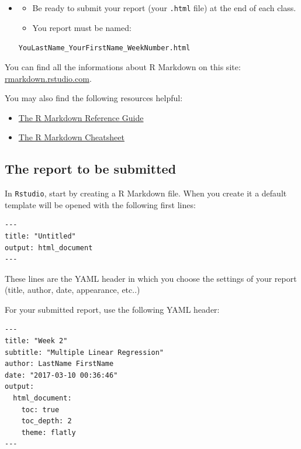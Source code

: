 \documentclass[]{book}
\providecommand{\tightlist}{%
  \setlength{\itemsep}{0pt}\setlength{\parskip}{0pt}}
\newenvironment{rmdblock}[1]
  {\begin{shaded*}
  \begin{itemize}
  \renewcommand{\labelitemi}{
    \raisebox{-.7\height}[0pt][0pt]{
      {\setkeys{Gin}{width=2em,keepaspectratio}\texttt{[image: img/icons/\#1]}}
    }
  }
  \item
  }
  {
  \end{itemize}
  \end{shaded*}
  }
\newenvironment{rmdcaution}
  {\begin{rmdblock}{caution}}
  {\end{rmdblock}}
\begin{document}
\begin{rmdcaution}
\begin{itemize}
\item
  Be ready to submit your report (your \texttt{.html} file) at the end
  of each class.
\item
  You report must be named:
\end{itemize}

\texttt{YouLastName\_YourFirstName\_WeekNumber.html}
\end{rmdcaution}

You can find all the informations about R Markdown on this site:
\href{http://rmarkdown.rstudio.com/lesson-1.html}{rmarkdown.rstudio.com}.

You may also find the following resources helpful:

\begin{itemize}
\tightlist
\item
  \href{https://www.rstudio.com/wp-content/uploads/2015/03/rmarkdown-reference.pdf}{The
  R Markdown Reference Guide}
\item
  \href{https://www.rstudio.com/wp-content/uploads/2016/03/rmarkdown-cheatsheet-2.0.pdf}{The
  R Markdown Cheatsheet}
\end{itemize}

\subsection*{The report to be
submitted}\label{the-report-to-be-submitted}

In \texttt{Rstudio}, start by creating a R Markdown file. When you
create it a default template will be opened with the following first
lines:

\begin{verbatim}
---
title: "Untitled"
output: html_document
---
\end{verbatim}

These lines are the YAML header in which you choose the settings of your
report (title, author, date, appearance, etc..)

For your submitted report, use the following YAML header:

\begin{verbatim}
---
title: "Week 2"
subtitle: "Multiple Linear Regression"
author: LastName FirstName
date: "2017-03-10 00:36:46"
output:
  html_document:
    toc: true
    toc_depth: 2
    theme: flatly
---
\end{verbatim}
\end{document}
